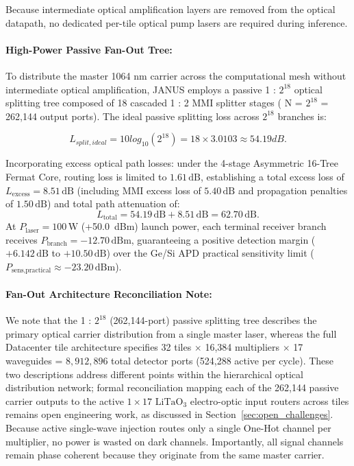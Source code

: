 \documentclass[journal]{IEEEtran}
\begin{document}
Because intermediate optical amplification layers are removed from the optical datapath, no dedicated per-tile optical pump lasers are required during inference.

\paragraph{\textbf{High-Power Passive Fan-Out Tree:}}

To distribute the master 1064 nm carrier across the computational mesh without intermediate optical amplification, JANUS employs a passive
1 : $2^{18}$ optical splitting tree composed of 18 cascaded 1 : 2 MMI splitter stages ( N = $2^{18}$ = 262,144 output ports). The ideal passive splitting loss across $2^{18}$ branches is:

\begin{equation}
L_{split,ideal} = 10 log_{10}(2^{18}) = 18 \times 3.0103 \approx 54.19 dB.
\end{equation}

Incorporating excess optical path losses: under the 4-stage Asymmetric 16-Tree Fermat Core, routing loss is limited to $1.61\,\text{dB}$, establishing a total excess loss of $L_{\text{excess}} = 8.51\,\text{dB}$ (including MMI excess loss of $5.40\,\text{dB}$ and propagation penalties of $1.50\,\text{dB}$) and total path attenuation of:
\begin{equation}
L_{\text{total}} = 54.19\,\text{dB} + 8.51\,\text{dB} = 62.70\,\text{dB}.
\end{equation}
At $P_{\text{laser}} = 100\,\text{W}$ (+50.0~dBm) launch power, each terminal receiver branch receives $P_{\text{branch}} = -12.70\,\text{dBm}$, guaranteeing a positive detection margin ($+6.142\,\mathrm{dB}$ to $+10.50\,\mathrm{dB}$) over the Ge/Si APD practical sensitivity limit ($P_{\text{sens,practical}} \approx -23.20\,\text{dBm}$).

\paragraph{\textbf{Fan-Out Architecture Reconciliation Note:}}

We note that the 1 : $2^{18}$ (262,144-port) passive splitting tree describes the primary optical carrier distribution from a single master laser, whereas the full Datacenter tile architecture specifies 32 tiles $\times$ 16,384 multipliers $\times$ 17 waveguides = $8{,}912{,}896$ total detector ports (524,288 active per cycle). These two descriptions address different points within the hierarchical optical distribution network; formal reconciliation mapping each of the 262,144 passive carrier outputs to the active $1 \times 17$ $\mathrm{LiTaO_3}$ electro-optic input routers across tiles remains open engineering work, as discussed in Section~\ref{sec:open_challenges}. Because active single-wave injection routes only a single One-Hot channel per multiplier, no power is wasted on dark channels. Importantly, all signal channels remain phase coherent because they originate from the same master carrier.
\end{document}
